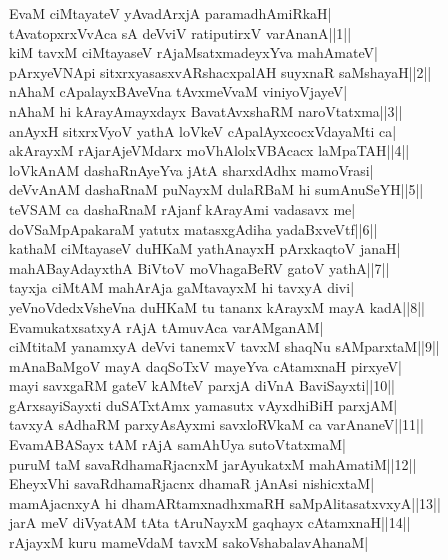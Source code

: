 \documentclass{article}
\begin{document}
EvaM ciMtayateV yAvadArxjA paramadhAmiRkaH|\\
tAvatopxrxVvAca sA deVviV ratiputirxV varAnanA||1||\\
kiM tavxM ciMtayaseV rAjaMsatxmadeyxYva mahAmateV|\\
pArxyeVNApi sitxrxyasasxvARshacxpalAH suyxnaR saMshayaH||2||\\
nAhaM cApalayxBAveVna tAvxmeVvaM viniyoVjayeV|\\
nAhaM hi kArayAmayxdayx BavatAvxshaRM naroVtatxma||3||\\
anAyxH sitxrxVyoV yathA loVkeV cApalAyxcocxVdayaMti ca|\\
akArayxM rAjarAjeVMdarx moVhAlolxVBAcacx laMpaTAH||4||\\
loVkAnAM dashaRnAyeYva jAtA sharxdAdhx mamoVrasi|\\
deVvAnAM dashaRnaM puNayxM dulaRBaM hi sumAnuSeYH||5||\\
teVSAM ca dashaRnaM rAjanf kArayAmi vadasavx me|\\
doVSaMpApakaraM yatutx matasxgAdiha yadaBxveVtf||6||\\
kathaM ciMtayaseV duHKaM yathAnayxH pArxkaqtoV janaH|\\
mahABayAdayxthA BiVtoV moVhagaBeRV gatoV yathA||7||\\
tayxja ciMtAM mahArAja gaMtavayxM hi tavxyA divi|\\
yeVnoVdedxVsheVna duHKaM tu tananx kArayxM mayA kadA||8||\\
EvamukatxsatxyA rAjA tAmuvAca varAMganAM|\\
ciMtitaM yanamxyA deVvi tanemxV tavxM shaqNu sAMparxtaM||9||\\
mAnaBaMgoV mayA daqSoTxV mayeYva cAtamxnaH pirxyeV|\\
mayi savxgaRM gateV kAMteV parxjA diVnA BaviSayxti||10||\\
gArxsayiSayxti duSATxtAmx yamasutx vAyxdhiBiH parxjAM|\\
tavxyA sAdhaRM parxyAsAyxmi savxloRVkaM ca varAnaneV||11||\\
EvamABASayx tAM rAjA samAhUya sutoVtatxmaM|\\
puruM taM savaRdhamaRjacnxM jarAyukatxM mahAmatiM||12||\\
EheyxVhi savaRdhamaRjacnx dhamaR jAnAsi nishicxtaM|\\
mamAjacnxyA hi dhamARtamxnadhxmaRH saMpAlitasatxvxyA||13||\\
jarA meV diVyatAM tAta tAruNayxM gaqhayx cAtamxnaH||14||\\
rAjayxM kuru mameVdaM tavxM sakoVshabalavAhanaM|\\
\end{document}
